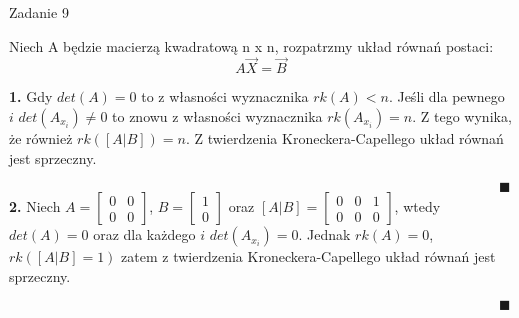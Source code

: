 \documentclass[a4paper]{article}
\begin{document}
\begin{center}
{\fontsize{20}{20}\selectfont Zadanie 9}
\end{center}

Niech A będzie macierzą kwadratową n x n, rozpatrzmy układ równań postaci:
$$A\overrightarrow{X} = \overrightarrow{B}$$
\begin{adjustwidth}{30pt}{30pt}
\textbf{1.} Gdy $det(A) = 0$ to z własności wyznacznika $rk(A) < n$. Jeśli dla pewnego $i$ $det(A_{x_{i}}) \neq 0 $ to znowu z własności wyznacznika $rk(A_{x_{i}}) = n $. Z tego wynika, że również $rk([A|B]) = n $. Z twierdzenia Kroneckera-Capellego układ równań jest sprzeczny.

$\hspace{420pt}\blacksquare$\\
\textbf{2.} Niech 
$ A = 
\begin{bmatrix}
    0 & 0\\
    0 & 0
  \end{bmatrix}
$,
$ B = 
\begin{bmatrix}
    1\\
    0
  \end{bmatrix}
$ oraz 
$ [A|B] = 
\begin{bmatrix}
    0 & 0 & 1\\
    0 & 0 & 0
  \end{bmatrix}
$, wtedy $det(A) = 0$ oraz dla każdego $i$ $det(A_{x_{i}}) = 0 $. Jednak $rk(A) = 0$, $rk([A|B] = 1)$ zatem z twierdzenia Kroneckera-Capellego układ równań jest sprzeczny.

$\hspace{420pt}\blacksquare$

\end{adjustwidth}
\end{document}
